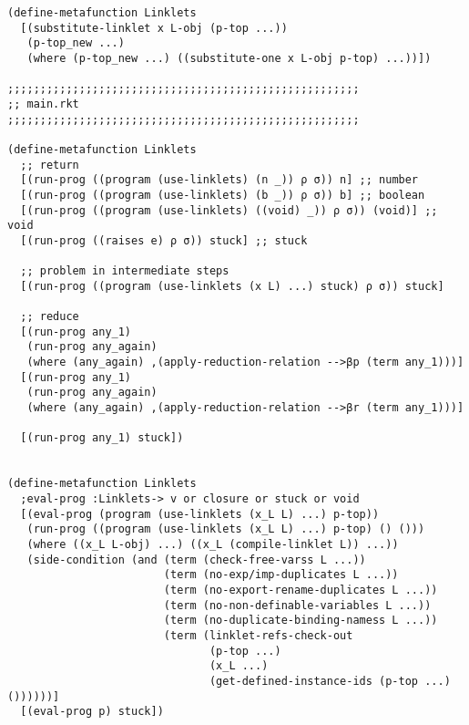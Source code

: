 \begin{lstlisting}[language=pltredex,
                basicstyle=\ttfamily\scriptsize,
                numbers=none, xleftmargin=2em]
(define-metafunction Linklets
  [(substitute-linklet x L-obj (p-top ...))
   (p-top_new ...)
   (where (p-top_new ...) ((substitute-one x L-obj p-top) ...))])

;;;;;;;;;;;;;;;;;;;;;;;;;;;;;;;;;;;;;;;;;;;;;;;;;;;;;;
;; main.rkt
;;;;;;;;;;;;;;;;;;;;;;;;;;;;;;;;;;;;;;;;;;;;;;;;;;;;;;

(define-metafunction Linklets
  ;; return
  [(run-prog ((program (use-linklets) (n _)) ρ σ)) n] ;; number
  [(run-prog ((program (use-linklets) (b _)) ρ σ)) b] ;; boolean
  [(run-prog ((program (use-linklets) ((void) _)) ρ σ)) (void)] ;; void
  [(run-prog ((raises e) ρ σ)) stuck] ;; stuck

  ;; problem in intermediate steps
  [(run-prog ((program (use-linklets (x L) ...) stuck) ρ σ)) stuck]

  ;; reduce
  [(run-prog any_1)
   (run-prog any_again)
   (where (any_again) ,(apply-reduction-relation -->βp (term any_1)))]
  [(run-prog any_1)
   (run-prog any_again)
   (where (any_again) ,(apply-reduction-relation -->βr (term any_1)))]

  [(run-prog any_1) stuck])


(define-metafunction Linklets
  ;eval-prog :Linklets-> v or closure or stuck or void
  [(eval-prog (program (use-linklets (x_L L) ...) p-top))
   (run-prog ((program (use-linklets (x_L L) ...) p-top) () ()))
   (where ((x_L L-obj) ...) ((x_L (compile-linklet L)) ...))
   (side-condition (and (term (check-free-varss L ...))
                        (term (no-exp/imp-duplicates L ...))
                        (term (no-export-rename-duplicates L ...))
                        (term (no-non-definable-variables L ...))
                        (term (no-duplicate-binding-namess L ...))
                        (term (linklet-refs-check-out
                               (p-top ...)
                               (x_L ...)
                               (get-defined-instance-ids (p-top ...) ())))))]
  [(eval-prog p) stuck])
\end{lstlisting}